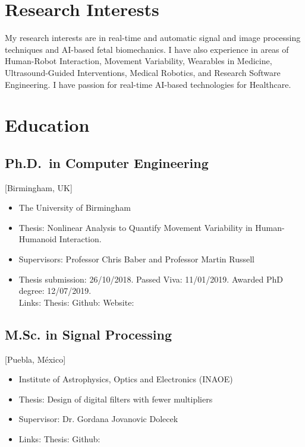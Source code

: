 \documentclass{mycv}
\begin{document}
\maketitle

\section{Research Interests}
My research interests are in real-time and automatic signal and image processing techniques and AI-based fetal biomechanics.
I have also experience in areas of Human-Robot Interaction, Movement Variability, Wearables in Medicine, Ultrasound-Guided Interventions, Medical Robotics, and Research Software Engineering.
I have passion for real-time AI-based technologies for Healthcare.

\section{Education}
\subsection{Ph.D.\ in Computer Engineering}[Birmingham, UK]
\vspace{-\parskip}%
\begin{itemize}[label={}]
  \item The University of Birmingham 
  \item Thesis: Nonlinear Analysis to Quantify Movement Variability in Human-Humanoid Interaction.   
  \item Supervisors: Professor Chris Baber and  Professor Martin Russell
  \item	Thesis submission: 26/10/2018. Passed Viva: 11/01/2019. Awarded PhD degree: 12/07/2019. \\
	Links: Thesis: \href{https://doi.org/10.5281/zenodo.3384145}{\faFilePdfO}
	Github: \href{http://doi.org/10.5281/zenodo.3384281}{\faGithubAlt}
	Website: \href{https://mxochicale-phd.github.io/site/}{\faExternalLink} 
\end{itemize}

\subsection{M.Sc. in Signal Processing}[Puebla, M\'exico]
\vspace{-\parskip}%
\begin{itemize}[label={}]
  \item Institute of Astrophysics, Optics and Electronics (INAOE) 
  \item Thesis: Design of digital filters with fewer multipliers
  \item Supervisor: Dr. Gordana Jovanovic Dolecek
  \item	Links: 
	Thesis: \href{https://github.com/mxochicale/publications/blob/master/thesis/M.Sc./doc/MPXochicale_MScThesis-2016.pdf}{\faFilePdfO}
	Github: \href{https://github.com/mxochicale/publications/tree/master/thesis/M.Sc.}{\faGithubAlt}
\end{itemize}
\end{document}

